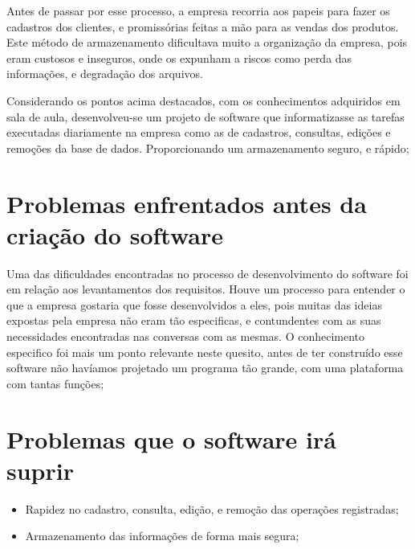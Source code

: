 	Antes de passar por esse processo, a empresa recorria aos papeis para fazer os cadastros dos clientes, e promissórias feitas a mão para as vendas dos produtos. Este método de armazenamento dificultava muito a organização da empresa, pois eram custosos e inseguros, onde os  expunham a riscos como perda das informações, e degradação dos arquivos.
	
	Considerando os pontos acima destacados, com os conhecimentos adquiridos em sala de aula, desenvolveu-se um projeto de software que informatizasse as tarefas executadas diariamente na empresa como as de cadastros, consultas, edições e remoções da base de dados. Proporcionando um armazenamento seguro, e rápido;

\section{Problemas enfrentados antes da criação do software}


	Uma das dificuldades encontradas no processo de desenvolvimento do software foi em relação aos levantamentos dos requisitos. Houve um processo para entender o que a empresa gostaria que fosse desenvolvidos a eles, pois muitas das ideias expostas pela empresa não eram tão especificas, e contundentes com as suas necessidades encontradas nas conversas com as mesmas. 
	O conhecimento especifico foi mais um ponto relevante neste quesito, antes de ter construído esse software não havíamos projetado um programa tão grande, com uma plataforma com tantas funções;

\section{Problemas que o software irá suprir}


\begin {itemize}
\item Rapidez no cadastro, consulta, edição, e remoção das operações registradas;
\item Armazenamento das informações de forma mais segura;

\end{itemize}





